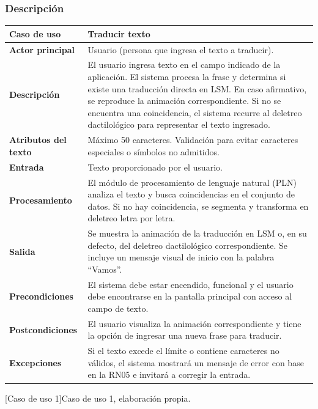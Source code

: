 \subsubsection{Descripción}

\noindent
\begin{tabularx}{\textwidth}{|l|X|}
\hline
\textbf{Caso de uso} & Traducir texto \\ \hline

\textbf{Actor principal} & Usuario (persona que ingresa el texto a traducir). \\ \hline

\textbf{Descripción} & El usuario ingresa texto en el campo indicado de la aplicación. El sistema procesa la frase y determina si existe una traducción directa en LSM. En caso afirmativo, se reproduce la animación correspondiente. Si no se encuentra una coincidencia, el sistema recurre al deletreo dactilológico para representar el texto ingresado. \\ \hline

\textbf{Atributos del texto} & Máximo 50 caracteres. Validación para evitar caracteres especiales o símbolos no admitidos. \\ \hline

\textbf{Entrada} & Texto proporcionado por el usuario. \\ \hline

\textbf{Procesamiento} & El módulo de procesamiento de lenguaje natural (PLN) analiza el texto y busca coincidencias en el conjunto de datos. Si no hay coincidencia, se segmenta y transforma en deletreo letra por letra. \\ \hline

\textbf{Salida} & Se muestra la animación de la traducción en LSM o, en su defecto, del deletreo dactilológico correspondiente. Se incluye un mensaje visual de inicio con la palabra “Vamos”. \\ \hline

\textbf{Precondiciones} & El sistema debe estar encendido, funcional y el usuario debe encontrarse en la pantalla principal con acceso al campo de texto. \\ \hline

\textbf{Postcondiciones} & El usuario visualiza la animación correspondiente y tiene la opción de ingresar una nueva frase para traducir. \\ \hline

\textbf{Excepciones} & Si el texto excede el límite o contiene caracteres no válidos, el sistema mostrará un mensaje de error con base en la RN05 e invitará a corregir la entrada. \\ \hline
\end{tabularx}
[Caso de uso 1]{Caso de uso 1, elaboración propia.}


